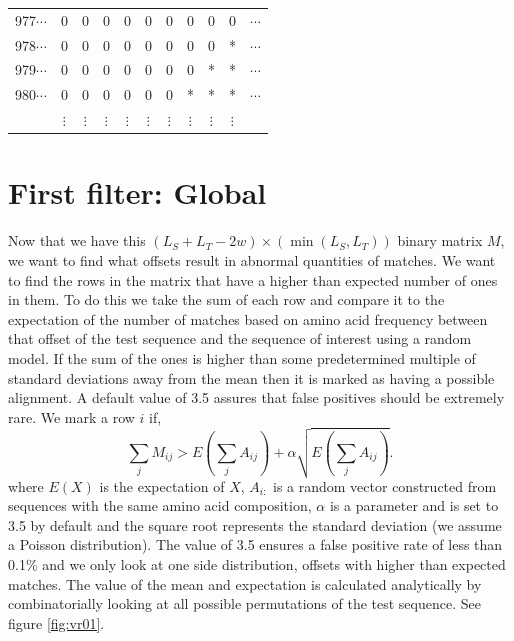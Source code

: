 \documentclass[phd,tocprelim]{cornell}
\begin{document}
\begin{table}[htp]
\begin{center}
{\begin{tabular}{|ccccccccccc|}
\small{977}$\cdots$ & 0 & 0 & 0 & 0 & 0 & 0 & 0 & 0 & 0 & $\cdots$ \\
\small{978}$\cdots$ & 0 & 0 & 0 & 0 & 0 & 0 & 0 & 0 & * & $\cdots$ \\
\small{979}$\cdots$ & 0 & 0 & 0 & 0 & 0 & 0 & 0 & * & * & $\cdots$ \\
\small{980}$\cdots$ & 0 & 0 & 0 & 0 & 0 & 0 & * & * & * & $\cdots$ \\
 & $\vdots$ &  $\vdots$ &  $\vdots$ &  $\vdots$ & $\vdots$ &  $\vdots$ &  $\vdots$ &  $\vdots$&  $\vdots$ & \\
\hline
\end{tabular}
}
\end{center}
\end{table}

\section{First filter: Global}

Now that we have this $(L_{S} + L_{T}-2w) \times (\min(L_{S},L_{T}))$ binary matrix $M$, we want to find what offsets result in abnormal quantities of matches. We want to find the rows in the matrix that have a higher than expected number of ones in them. To do this we take the sum of each row and compare it to the expectation of the number of matches based on amino acid frequency between that offset of the test sequence and the sequence of interest using a random model. If the sum of the ones is higher than some predetermined multiple of standard deviations away from the mean then it is marked as having a possible alignment. A default value of 3.5 assures that false positives should be extremely rare. We mark a row $i$ if,
\begin{equation}
    \sum_{j} M_{ij} > E\left(\sum_{j} A_{ij}\right) + \alpha \sqrt{E\left(\sum_{j} A_{ij}\right)}.
\end{equation}
where $E(X)$ is the expectation of $X$, $A_{i:}$ is a random vector constructed from sequences with the same amino acid composition, $\alpha$ is a parameter and is set to 3.5 by default and the square root represents the standard deviation (we assume a Poisson distribution). The value of 3.5 ensures a false positive rate of less than 0.1\% and we only look at one side distribution, offsets with higher than expected matches. The value of the mean and expectation is calculated analytically by combinatorially looking at all possible permutations of the test sequence. See figure \ref{fig:vr01}.
\end{document}
